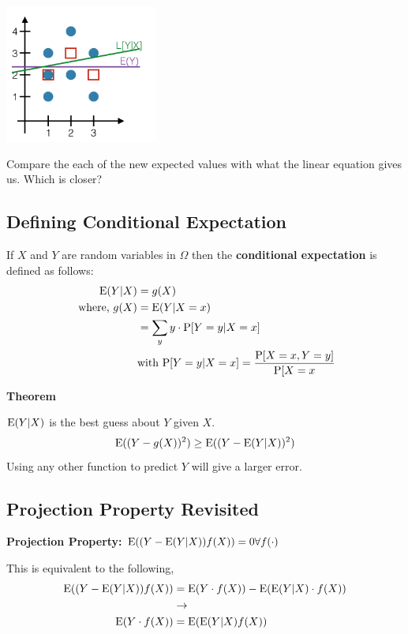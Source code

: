 \documentclass{exam}
\begin{document}
\begin{center}
\includegraphics[width=5cm]{llse_condexp2.jpg}
\end{center}

Compare the each of the new expected values with what the linear equation gives us. Which is closer?

\clearpage

\subsection{Defining Conditional Expectation}

If $X$ and $Y$ are random variables in $\Omega$ then the \textbf{conditional expectation} is defined as follows:
\begin{align*}
\text{E}(Y | X) &= g(X) \\
\text{ where, } g(X) &= \text{E}(Y | X = x) \\
&= \sum_{y} y \cdot \text{P}[Y=y | X = x] \\
&\text{with } \text{P}[Y=y | X=x] = \frac{\text{P}[X=x, Y=y]}{\text{P}[X=x}
\end{align*}

\textbf{Theorem}

$\text{E}(Y | X)$ is the best guess about $Y$ given $X$.
\[\text{E}((Y - g(X))^2) \geq \text{E}((Y - \text{E}(Y | X))^2)\]
Using any other function to predict $Y$ will give a larger error.

\subsection{Projection Property Revisited}

\textbf{Projection Property: } $\text{E}((Y - \text{E}(Y | X))f(X)) = 0 \forall f(\cdot)$

This is equivalent to the following, 
\begin{align*}
\text{E}((Y - \text{E}(Y | X))f(X)) &= \text{E}(Y \cdot f(X) )- \text{E}(\text{E}(Y | X) \cdot f(X))\\
&\rightarrow\\
\text{E}(Y \cdot f(X)) &= \text{E}(\text{E}(Y | X) f(X))
\end{align*}
\end{document}
